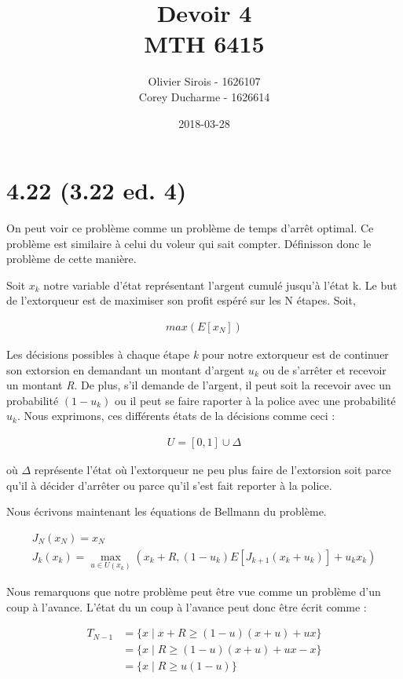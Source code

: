 \documentclass[oneside]{book}
\title{Devoir 4 \\ MTH 6415}
\date{2018-03-28}
\author{Olivier Sirois - 1626107 \\ Corey Ducharme - 1626614}
\begin{document}
\setcounter{page}{1}
\maketitle
\section*{4.22 (3.22 ed. 4)}
On peut voir ce problème comme un problème de temps d'arrêt
optimal. Ce problème est similaire à celui du voleur qui sait
compter. Définisson donc le problème de cette manière.

Soit $x_k$ notre variable d'état représentant l'argent cumulé jusqu'à
l'état k.  Le but de l'extorqueur est de maximiser son profit espéré
sur les N étapes. Soit,

\begin{align*}
  max(E[x_N])
\end{align*}

Les décisions possibles à chaque étape \textit{k} pour notre
extorqueur est de continuer son extorsion en demandant un montant
d'argent $u_k$ ou de s'arrêter et recevoir un montant \textit{R}. De
plus, s'il demande de l'argent, il peut soit la recevoir avec un
probabilité $(1-u_k)$ ou il peut se faire raporter à la police avec
une probabilité $u_k$. Nous exprimons, ces différents états de la
décisions comme ceci :

\begin{align*}
  U = [0, 1] \cup {\Delta}
\end{align*}

où $\Delta$ représente l'état où l'extorqueur ne peu plus faire de
l'extorsion soit parce qu'il à décider d'arrêter ou parce qu'il s'est
fait reporter à la police.

Nous écrivons maintenant les équations de Bellmann du problème.

\begin{gather*}
  J_N(x_N) = x_N \\
  J_k(x_k) = \max_{u \in U(x_k)}(x_k + R, (1-u_k)E[J_{k+1}(x_k+u_k)] + u_kx_k)
\end{gather*}

Nous remarquons que notre problème peut être vue comme un problème
d'un coup à l'avance. L'état du un coup à l'avance peut donc être
écrit comme :

\begin{align*}
  T_{N-1} &= \{x \mid x + R \geq (1-u)(x+u) + ux\} \\
  &= \{x \mid R \geq (1-u)(x+u) + ux - x\} \\
  &= \{x \mid R \geq u(1-u)\}
\end{align*}
\end{document}

